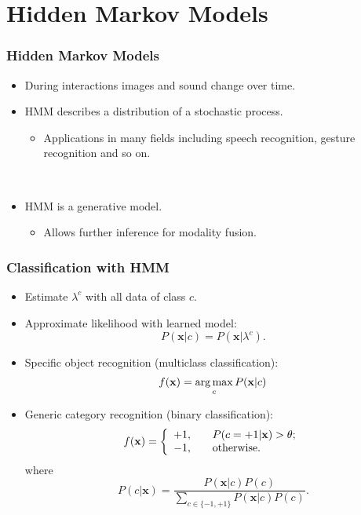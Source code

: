 \documentclass{beamer}
\begin{document}
\section{Hidden Markov Models}
\begin{frame}
  \frametitle{Hidden Markov Models}

  \begin{itemize}
    \item During interactions images and sound change over time.
    \item HMM describes a distribution of a stochastic process.
      \begin{itemize}
        \item Applications in many fields including speech recognition, gesture recognition and so on. 
      \end{itemize}
      ~

    \item HMM is a generative model.
      \begin{itemize}
        \item Allows further inference for modality fusion. 
      \end{itemize}
  \end{itemize}
\end{frame}

\begin{frame}
  \frametitle{Classification with HMM}

  \begin{itemize}
    \item Estimate $\lambda^c$ with all data of class $c$.

    \item Approximate likelihood with learned model:
      \[ P(\mathbf{x}|c) = P(\mathbf{x}|\lambda^c) . \]
    \item Specific object recognition (multiclass classification):
      \[ f(\mathbf{x}) = \operatorname*{arg\,max}_{c} P(\mathbf{x}|c) \]
    \item Generic category recognition (binary classification):
      \[ 
        f(\mathbf{x}) = \left\{
          \begin{array}{l l}
            +1, & \quad P(c=+1|\mathbf{x}) > \theta; \\
            -1, & \quad \text{otherwise.}
          \end{array} \right.
        \]
        where
        \[ P(c|\mathbf{x}) = \frac{P(\mathbf{x}|c)P(c)}{\sum_{c \in \{-1,+1\}} P(\mathbf{x}|c)P(c)} . \]
    \end{itemize}
  \end{frame}
\end{document}

